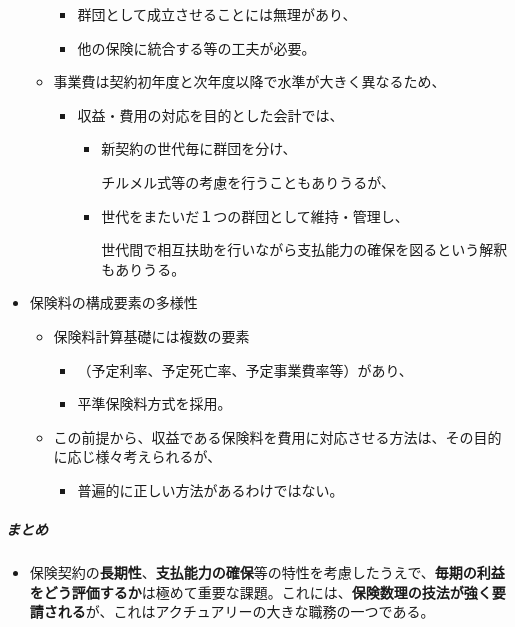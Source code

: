 \documentclass[report,gutter=10mm,fore-edge=10mm,uplatex,dvipdfmx]{jlreq}
\begin{document}
\begin{itemize}
\begin{itemize}
    \begin{itemize}
    \tightlist
    \item
      群団として成立させることには無理があり、
    \item
      他の保険に統合する等の工夫が必要。
    \end{itemize}
  \item
    事業費は契約初年度と次年度以降で水準が大きく異なるため、

    \begin{itemize}
    \tightlist
    \item
      収益・費用の対応を目的とした会計では、

      \begin{itemize}
      \tightlist
      \item
        新契約の世代毎に群団を分け、

          チルメル式等の考慮を行うこともありうるが、
      \item
        世代をまたいだ１つの群団として維持・管理し、

          世代間で相互扶助を行いながら支払能力の確保を図るという解釈もありうる。
      \end{itemize}
    \end{itemize}
  \end{itemize}
\item
  保険料の構成要素の多様性

  \begin{itemize}
  \tightlist
  \item
    保険料計算基礎には複数の要素

    \begin{itemize}
    \tightlist
    \item
      （予定利率、予定死亡率、予定事業費率等）があり、
    \item
      平準保険料方式を採用。
    \end{itemize}
  \item
    この前提から、収益である保険料を費用に対応させる方法は、その目的に応じ様々考えられるが、

    \begin{itemize}
    \tightlist
    \item
      普遍的に正しい方法があるわけではない。
    \end{itemize}
  \end{itemize}
\end{itemize}

\subparagraph{まとめ}

\begin{itemize}
\tightlist
\item
  保険契約の\textbf{長期性}、\textbf{支払能力の確保}等の特性を考慮したうえで、\textbf{毎期の利益をどう評価するか}は極めて重要な課題。これには、\textbf{保険数理の技法が強く要請される}が、これはアクチュアリーの大きな職務の一つである。
\end{itemize}
\end{document}

